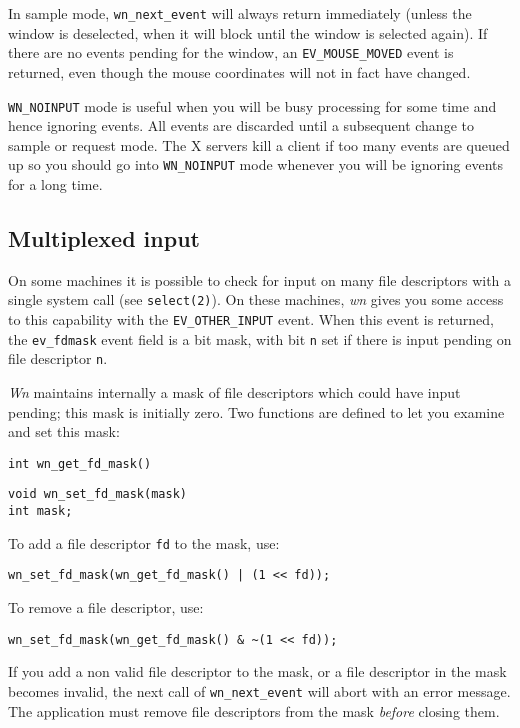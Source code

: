 In sample mode, {\tt wn\_next\_event} will always return immediately 
(unless the window is deselected, when it will block until the window
is selected again).
If there are no events pending for the window, 
an {\tt EV\_MOUSE\_MOVED} event is returned,
even though the mouse coordinates will not in fact have changed.

{\tt WN\_NOINPUT} mode is useful when you will be busy processing for
some time and hence ignoring events.
All events are discarded until a subsequent change to sample or request
mode.
The X servers kill a client if too many events are queued up so you
should go into {\tt WN\_NOINPUT} mode whenever you will be ignoring
events for a long time.
\subsection{Multiplexed input}
On some machines it is possible to check for input on many file descriptors
with a single system call (see {\tt select(2)}).
On these machines, {\em wn} gives you some access to this capability with the
{\tt EV\_OTHER\_INPUT} event.
When this event is returned, the {\tt ev\_fdmask} event field is a bit mask,
with bit {\tt n} set if there is input pending on file descriptor {\tt n}.

{\em Wn} maintains internally a mask of file descriptors which could have
input pending; this mask is initially zero.
Two functions are defined to let you examine and set this mask:
\begin{verbatim}
int wn_get_fd_mask()
\end{verbatim}
\begin{verbatim}
void wn_set_fd_mask(mask)
int mask;
\end{verbatim}
To add a file descriptor {\tt fd} to the mask, use:
\begin{verbatim}
wn_set_fd_mask(wn_get_fd_mask() | (1 << fd));
\end{verbatim}
To remove a file descriptor, use:
\begin{verbatim}
wn_set_fd_mask(wn_get_fd_mask() & ~(1 << fd));
\end{verbatim}

If you add a non valid file descriptor to the mask, or a file descriptor in the
mask becomes invalid, the next call of {\tt wn\_next\_event} will abort with
an error message.
The application must remove file descriptors from the mask {\em before}
closing them.

